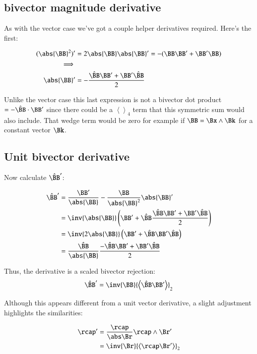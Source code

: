 \documentclass{article}      %
\newcommand{\Bcap}[0]{\hat{\BB}}
\newcommand{\Babs}[0]{\abs{\BB}}
\newcommand{\gpgrade}[2] {{\left\langle{{#1}}\right\rangle}_{#2}}
\newcommand{\gpgradetwo}[1] {\gpgrade{#1}{2}}
\newcommand{\gpgradefour}[1] {\gpgrade{#1}{4}}
\begin{document}
\subsection{ bivector magnitude derivative }

As with the vector case we've got a couple helper derivatives required.  Here's the first:

\begin{align*}
({\Babs^2})' &= 2\Babs\Babs' = -(\BB\BB' + \BB'\BB) \\
\implies \\
{\Babs}' &= -\frac{\Bcap\BB' + \BB'\Bcap}{2} \\
\end{align*}

Unlike the vector case this last expression is not a bivector dot product $= -\Bcap\cdot \BB'$ since there could be a
$\gpgradefour{}$ term that this symmetric sum would also include.
That wedge term would be zero for example if $\BB = \Bx \wedge \Bk$ for a constant vector $\Bk$.

\subsection{ Unit bivector derivative }

Now calculate $\Bcap'$:

\begin{align*}
\Bcap'
&= \frac{\BB'}{\Babs} - \frac{\BB}{\Babs^2}\Babs' \\
&= \inv{\Babs}\left( \BB' + {\Bcap}\frac{\Bcap\BB' + \BB'\Bcap}{2} \right) \\
&= \inv{2\Babs}\left( \BB' + \Bcap\BB'\Bcap \right) \\
&= \frac{\Bcap}{\Babs}\frac{-\Bcap\BB' + \BB'\Bcap}{2} \\
\end{align*}

Thus, the derivative is a scaled bivector rejection:
\begin{equation}
\Bcap' = \inv{\BB}\gpgradetwo{\Bcap\BB'}
\end{equation}

Although this appears different from a unit vector derivative, a slight adjustment highlights the
similarities:

\begin{align*}
\rcap' 
&= \frac{\rcap}{\abs\Br}\rcap \wedge \Br' \\
&= \inv{\Br}\gpgradetwo{\rcap\Br'} \\
\end{align*}
\end{document}
